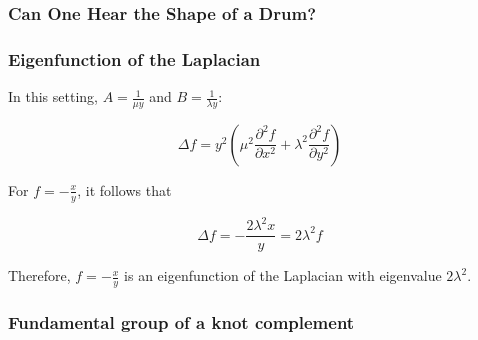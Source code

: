 \documentclass[aspectratio=169]{beamer}
\begin{document}
\begin{frame}
    \frametitle{Can One Hear the Shape of a Drum?}
\end{frame}

\begin{frame}
    \frametitle{Eigenfunction of the Laplacian}
    In this setting, \(A = \frac{1}{\mu y}\) and \(B = \frac{1}{\lambda y}\):

    \[
        \Delta f = y^2 \left(\mu^2 \frac{\partial^2 f}{\partial x^2} + \lambda^2 \frac{\partial^2 f}{\partial y^2}\right)
    \]

    For \(f = -\frac{x}{y}\), it follows that

    \[
        \Delta f = - \frac{2 \lambda^2 x}{y} = 2 \lambda^2 f
    \]

    Therefore, \(f = -\frac{x}{y}\) is an eigenfunction of the Laplacian with eigenvalue \(2\lambda^2\).
\end{frame}

\begin{frame}
    \frametitle{Fundamental group of a knot complement}
\end{frame}
\end{document}
